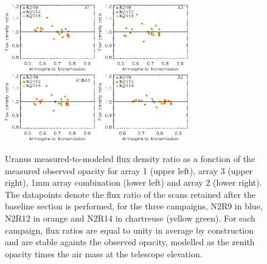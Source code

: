 \begin{figure}[ht!]
  \begin{center}
    \includegraphics[clip=true, trim={0, -0.3cm, -0.3cm, 0}, width=0.35\textwidth]{Figures/Calibration/plot_flux_density_ratio_obstau_uranus_corrected_skydip_narrow_a1.pdf}
    \includegraphics[clip=true, trim={0, -0.3cm, -0.3cm, 0}, width=0.35\textwidth]{Figures/Calibration/plot_flux_density_ratio_obstau_uranus_corrected_skydip_narrow_a3.pdf}
    \includegraphics[clip=true, trim={0, -0.3cm, -0.3cm, 0}, width=0.35\textwidth]{Figures/Calibration/plot_flux_density_ratio_obstau_uranus_corrected_skydip_narrow_1mm.pdf}
    \includegraphics[clip=true, trim={0, -0.3cm, -0.3cm, 0}, width=0.35\textwidth]{Figures/Calibration/plot_flux_density_ratio_obstau_uranus_corrected_skydip_narrow_a2.pdf}
    \caption[Uranus flux density stability against observed
  opacity]{Uranus measured-to-modeled flux density ratio as a fonction
  of the measured observed opacity for array 1 (upper left), array 3
  (upper right), 1mm array combination (lower left) and array 2 (lower
  right). The datapoints denote the flux ratio of the scans retained after the
  baseline section is performed, for the three campaigns, N2R9
  in blue, N2R12 in orange and N2R14 in chartreuse (yellow green). For
  each campaign, flux ratios are equal to unity in average by
  construction and are stable againts the observed opacity, modelled as
  the zenith opacity times the air mass at the telescope elevation.}
\label{fig:uranus_flux_obstau}
\end{center}
\end{figure}
